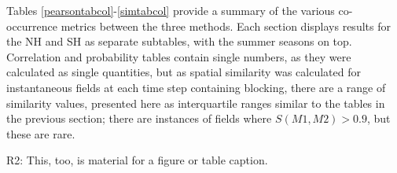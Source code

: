 \documentclass[smallextended]{svjour3}       %
\numberwithin{equation}{section}
\begin{document}
Tables \ref{pearsontabcol}-\ref{simtabcol} provide a summary of the various co-occurrence metrics between the three methods. Each section displays results for the NH and SH as separate subtables, with the summer seasons on top. Correlation and probability tables contain single numbers, as they were calculated as single quantities, but as spatial similarity was calculated for instantaneous fields at each time step containing blocking, there are a range of similarity values, presented here as interquartile ranges similar to the tables in the previous section; there are instances of fields where $S(M1,M2)>0.9$, but these are rare. 

{\color{teal}R2: This, too, is material for a figure or table caption.}
\end{document}
